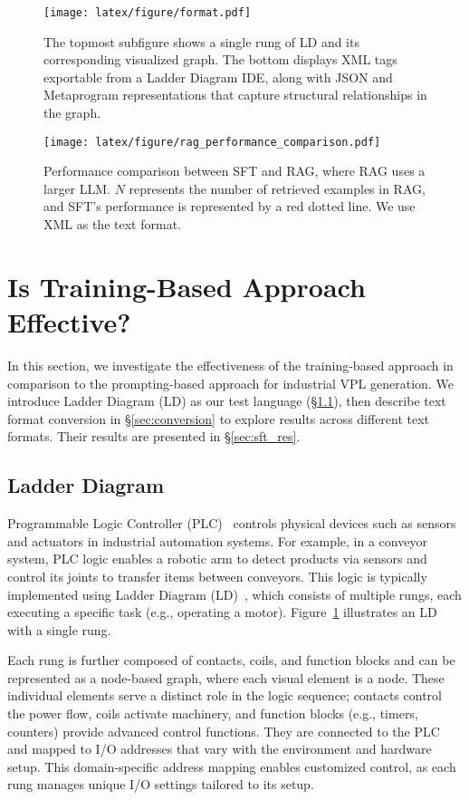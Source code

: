 \begin{figure}
    \centering
    \texttt{[image: latex/figure/format.pdf]}
    \caption{The topmost subfigure shows a single rung of LD and its corresponding visualized graph. The bottom displays XML tags exportable from a Ladder Diagram IDE, along with JSON and Metaprogram representations that capture structural relationships in the graph.}
    \label{fig:format}
\end{figure}


\begin{figure*}[!th]
    \centering
    \texttt{[image: latex/figure/rag\_performance\_comparison.pdf]} 
    \caption{Performance comparison between SFT and RAG, where RAG uses a larger LLM. $N$ represents the number of retrieved examples in RAG, and SFT’s performance is represented by a red dotted line. We use XML as the text format.}
    \label{fig:rag_sft_performance}
\end{figure*}


\section{Is Training-Based Approach Effective?}
In this section, we investigate the effectiveness of the training-based approach in comparison to the prompting-based approach for industrial VPL generation. We introduce Ladder Diagram (LD) as our test language (\S\ref{sec:ld}), then describe text format conversion in \S\ref{sec:conversion} to explore results across different text formats. Their results are presented in \S\ref{sec:sft_res}.
\subsection{Ladder Diagram}\label{sec:ld}
Programmable Logic Controller (PLC)~\citep{erickson1996programmable} controls physical devices such as sensors and actuators in industrial automation systems. For example, in a conveyor system, PLC logic enables a robotic arm to detect products via sensors and control its joints to transfer items between conveyors. This logic is typically implemented using Ladder Diagram (LD)~\citep{ladderlogic}, which consists of multiple rungs, each executing a specific task (e.g., operating a motor). Figure~\ref{fig:format} illustrates an LD with a single rung.

Each rung is further composed of contacts, coils, and function blocks and can be represented as a node-based graph, where each visual element is a node. These individual elements serve a distinct role in the logic sequence; contacts control the power flow, coils activate machinery, and function blocks (e.g., timers, counters) provide advanced control functions. They are connected to the PLC and mapped to I/O addresses that vary with the environment and hardware setup. This domain-specific address mapping enables customized control, as each rung manages unique I/O settings tailored to its setup.

